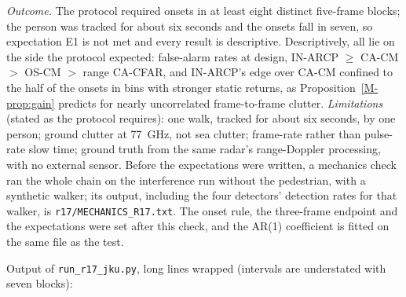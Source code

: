 \emph{Outcome.} The protocol required onsets in at least eight distinct five-frame blocks; the person was tracked for about six seconds and the onsets fall in seven, so expectation E1 is not met and every result is descriptive. Descriptively, all lie on the side the protocol expected: false-alarm rates at design, IN-ARCP $\ge$ CA-CM $>$ OS-CM $>$ range CA-CFAR, and IN-ARCP's edge over CA-CM confined to the half of the onsets in bins with stronger static returns, as Proposition~\ref{M-prop:gain} predicts for nearly uncorrelated frame-to-frame clutter. \emph{Limitations} (stated as the protocol requires): one walk, tracked for about six seconds, by one person; ground clutter at 77~GHz, not sea clutter; frame-rate rather than pulse-rate slow time; ground truth from the same radar's range-Doppler processing, with no external sensor. Before the expectations were written, a mechanics check ran the whole chain on the interference run without the pedestrian, with a synthetic walker; its output, including the four detectors' detection rates for that walker, is \texttt{r17/MECHANICS\_R17.txt}. The onset rule, the three-frame endpoint and the expectations were set after this check, and the AR(1) coefficient is fitted on the same file as the test.

Output of \texttt{run\_r17\_jku.py}, long lines wrapped (intervals are understated with seven blocks):
